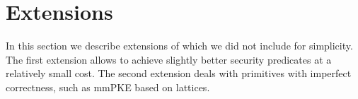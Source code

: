 
\section{Extensions}\label{sec:extensions}
In this section we describe extensions of \saik which we did not include for simplicity. The first extension allows to achieve slightly better security predicates at a relatively small cost. The second extension deals with primitives with imperfect correctness, such as mmPKE based on lattices.





